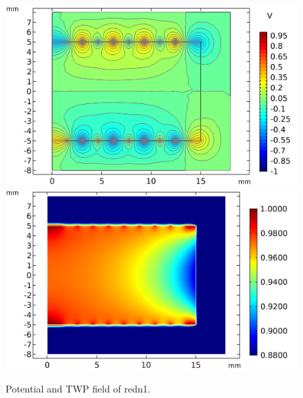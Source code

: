 \begin{figure}
\centering
\includegraphics[scale=0.5]{Figures/ElectrodesExperimental/potential_redn1.png}
\includegraphics[scale=0.5]{Figures/ElectrodesExperimental/twp_redn1.png}
\caption{Potential and TWP field of redn1.}
\label{fig:efield-redn1}
\end{figure}

